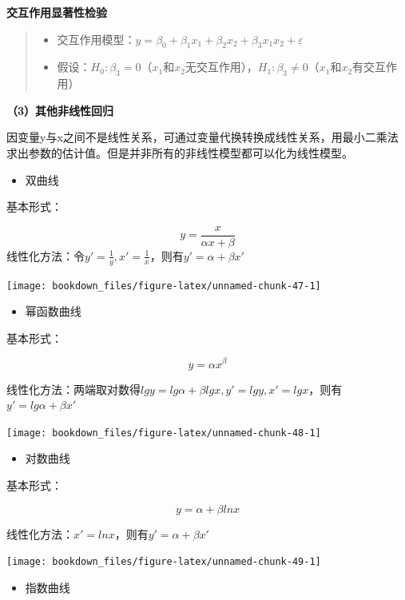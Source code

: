 \documentclass[]{ctexbook}
\providecommand{\tightlist}{%
  \setlength{\itemsep}{0pt}\setlength{\parskip}{0pt}}
\begin{document}
\textbf{交互作用显著性检验}

\begin{quote}
\begin{itemize}
\tightlist
\item
  交互作用模型：\(y=\beta_0+\beta_1x_1+\beta_2x_2+\beta_3x_1x_2+\varepsilon\)
\item
  假设：\(H_0:\beta_3=0\)（\(x_1\)和\(x_2\)无交互作用），\(H_1:\beta_3\neq 0\)（\(x_1\)和\(x_2\)有交互作用）
\end{itemize}
\end{quote}

\textbf{（3）其他非线性回归}

因变量y与x之间不是线性关系，可通过变量代换转换成线性关系，用最小二乘法求出参数的估计值。但是并非所有的非线性模型都可以化为线性模型。

\begin{itemize}
\tightlist
\item
  双曲线
\end{itemize}

基本形式：

\[y=\frac{x}{\alpha x+\beta}\]
线性化方法：令\(y'=\frac{1}{y},x'=\frac{1}{x}\)，则有\(y'=\alpha+\beta x'\)

\texttt{[image: bookdown\_files/figure-latex/unnamed-chunk-47-1]}

\begin{itemize}
\tightlist
\item
  幂函数曲线
\end{itemize}

基本形式：

\[y=\alpha x^\beta\]

线性化方法：两端取对数得\(lgy=lg\alpha+\beta lgx,y'=lgy,x'=lgx\)，则有\(y'=lg\alpha+\beta x'\)

\texttt{[image: bookdown\_files/figure-latex/unnamed-chunk-48-1]}

\begin{itemize}
\tightlist
\item
  对数曲线
\end{itemize}

基本形式：

\[y=\alpha+\beta lnx\]

线性化方法：\(x'=lnx\)，则有\(y'=\alpha+\beta x'\)

\texttt{[image: bookdown\_files/figure-latex/unnamed-chunk-49-1]}

\begin{itemize}
\tightlist
\item
  指数曲线
\end{itemize}
\end{document}
